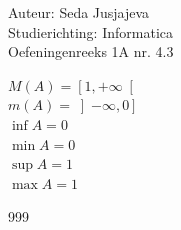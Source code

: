 \documentclass[a4paper]{article}
\begin{document}
\noindent \large Auteur: Seda Jusjajeva\\
\noindent \large Studierichting: Informatica\\
\noindent \large Oefeningenreeks 1A nr. 4.3\\

\medskip

\normalsize

$M(A) = \left[ 1, +\infty \right[$\\

$m(A) = \left]-\infty, 0 \right]$\\

$\inf A = 0$\\

$\min A = 0$\\

$\sup A = 1$\\

$\max A = 1$\\



\begin{thebibliography}{999}
\end{thebibliography}
\end{document}
